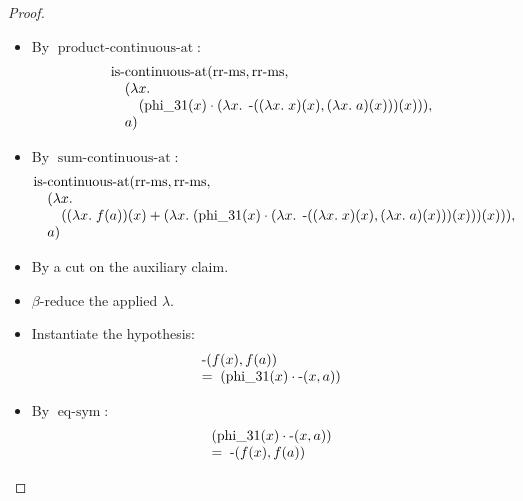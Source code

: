 \documentclass[11pt]{article}
\theoremstyle{plain}
\begin{document}
\begin{proof}
\begin{itemize}[leftmargin=2.8em, itemsep=4pt, parsep=1pt]
  \item[\textbf{16}] By $\operatorname{product\text{-}continuous\text{-}at}$:
\begin{equation*}
\begin{array}{@{}l@{}} \operatorname{is\text{-}continuous\text{-}at}(\operatorname{rr\text{-}ms}, \operatorname{rr\text{-}ms}, \\ \quad (\lambda x.\; \\ \quad \quad (\operatorname{phi\_31}(x) \cdot (\lambda x.\; \operatorname{\text{-}}((\lambda x.\; x)(x), (\lambda x.\; a)(x)))(x))), \\ \quad a) \end{array}
\end{equation*}

  \item[\textbf{17}] By $\operatorname{sum\text{-}continuous\text{-}at}$:
\begin{equation*}
\begin{array}{@{}l@{}} \operatorname{is\text{-}continuous\text{-}at}(\operatorname{rr\text{-}ms}, \operatorname{rr\text{-}ms}, \\ \quad (\lambda x.\; \\ \quad \quad ((\lambda x.\; f(a))(x) + (\lambda x.\; (\operatorname{phi\_31}(x) \cdot (\lambda x.\; \operatorname{\text{-}}((\lambda x.\; x)(x), (\lambda x.\; a)(x)))(x)))(x))), \\ \quad a) \end{array}
\end{equation*}

  \item[\textbf{18}] By a cut on the auxiliary claim.
  \item[\textbf{19--20}] $\beta$-reduce the applied $\lambda$.
  \item[\textbf{21}] Instantiate the hypothesis:
\begin{equation*}
\begin{array}{@{}l@{}} \operatorname{\text{-}}(f(x), f(a)) \\ =\; (\operatorname{phi\_31}(x) \cdot \operatorname{\text{-}}(x, a)) \end{array}
\end{equation*}

  \item[\textbf{22}] By $\operatorname{eq\text{-}sym}$:
\begin{equation*}
\begin{array}{@{}l@{}} (\operatorname{phi\_31}(x) \cdot \operatorname{\text{-}}(x, a)) \\ =\; \operatorname{\text{-}}(f(x), f(a)) \end{array}
\end{equation*}


\end{itemize}
\end{proof}
\end{document}
